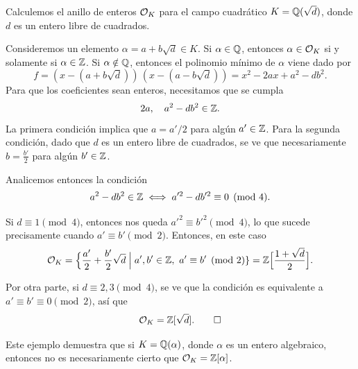 \begin{ejemplo}
  Calculemos el anillo de enteros $\mathcal{O}_K$ para el campo cuadrático
  $K = \mathbb{Q} (\sqrt{d})$, donde $d$ es un entero libre de cuadrados.

  Consideremos un elemento $\alpha = a + b\sqrt{d} \in K$.
  Si $\alpha \in \mathbb{Q}$, entonces $\alpha \in \mathcal{O}_K$ si y solamente si
  $\alpha \in \mathbb{Z}$. Si $\alpha \notin \mathbb{Q}$, entonces el polinomio mínimo de
  $\alpha$ viene dado por
  $$f = (x - (a + b\sqrt{d}))\,(x - (a - b\sqrt{d})) = x^2 - 2ax + a^2 - db^2.$$
  Para que los coeficientes sean enteros, necesitamos que se cumpla
  $$2a, \quad a^2 - db^2 \in \mathbb{Z}.$$
  La primera condición implica que $a = a'/2$ para algún $a' \in \mathbb{Z}$.
  Para la segunda condición, dado que $d$ es un entero libre de cuadrados,
  se ve que necesariamente $b = \frac{b'}{2}$ para algún $b' \in \mathbb{Z}$.

  Analicemos entonces la condición
  $$a^2 - db^2 \in \mathbb{Z} \iff a'^2 - db'^2 \equiv 0 \pmod{4}.$$

  Si $d \equiv 1 \pmod{4}$, entonces nos queda $a'^2 \equiv b'^2 \pmod{4}$,
  lo que sucede precisamente cuando $a' \equiv b' \pmod{2}$.
  Entonces, en este caso
  \[ \mathcal{O}_K = \Bigl\{ \frac{a'}{2} + \frac{b'}{2}\sqrt{d} \Bigm|
                    a', b' \in \mathbb{Z}, ~ a'\equiv b' \pmod{2} \}
          = \mathbb{Z} \Bigl[\frac{1+\sqrt{d}}{2}\Bigr]. \]

  Por otra parte, si $d \equiv 2,3 \pmod{4}$, se ve que la condición es
  equivalente a $a' \equiv b' \equiv 0 \pmod{2}$, así que
  \[ \mathcal{O}_K = \mathbb{Z} [\sqrt{d}]. \qedhere \]
\end{ejemplo}

Este ejemplo demuestra que si $K = \mathbb{Q} (\alpha)$, donde $\alpha$ es un entero
algebraico, entonces no es necesariamente cierto que $\mathcal{O}_K = \mathbb{Z} [\alpha]$.

